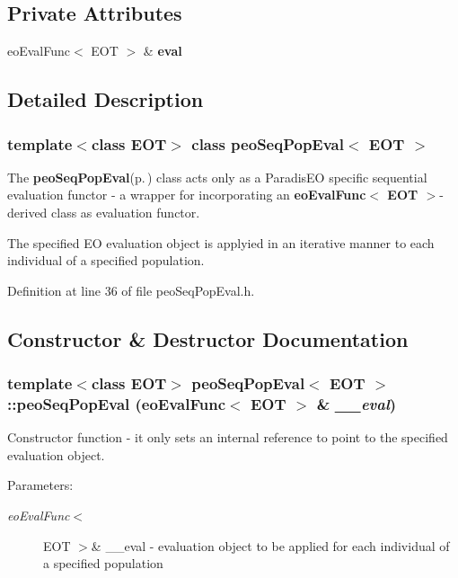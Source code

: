 \subsection*{Private Attributes}
\begin{CompactItemize}
\item 
eo\-Eval\-Func$<$ EOT $>$ \& {\bf eval}\label{classpeo_seq_pop_eval_5465f31386c6b96bc8f7fb9393a28a2f}

\end{CompactItemize}


\subsection{Detailed Description}
\subsubsection*{template$<$class EOT$>$ class peo\-Seq\-Pop\-Eval$<$ EOT $>$}

The {\bf peo\-Seq\-Pop\-Eval}{\rm (p.\,\pageref{classpeo_seq_pop_eval})} class acts only as a Paradis\-EO specific sequential evaluation functor - a wrapper for incorporating an {\bf eo\-Eval\-Func$<$ EOT $>$}-derived class as evaluation functor. 

The specified EO evaluation object is applyied in an iterative manner to each individual of a specified population. 



Definition at line 36 of file peo\-Seq\-Pop\-Eval.h.

\subsection{Constructor \& Destructor Documentation}
\subsubsection{\setlength{\rightskip}{0pt plus 5cm}template$<$class EOT$>$ {\bf peo\-Seq\-Pop\-Eval}$<$ EOT $>$::{\bf peo\-Seq\-Pop\-Eval} (eo\-Eval\-Func$<$ EOT $>$ \& {\em \_\-\_\-eval})}\label{classpeo_seq_pop_eval_a41f91ab4b2aeb325ff75feb66d4e003}


Constructor function - it only sets an internal reference to point to the specified evaluation object. 

\begin{Desc}
\item[Parameters:]
\begin{description}
\item[{\em eo\-Eval\-Func$<$}]EOT $>$\& \_\-\_\-eval - evaluation object to be applied for each individual of a specified population \end{description}
\end{Desc}


